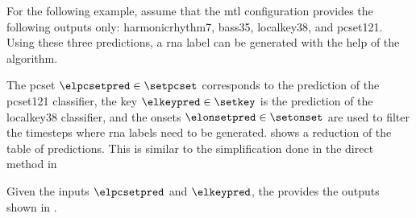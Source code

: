
For the following example, assume that the \gls{mtl}
configuration provides the following outputs only:
\gls{harmonicrhythm7}, \gls{bass35},  \gls{localkey38}, and
\gls{pcset121}. Using these three predictions, a \gls{rna}
label can be generated with the help of the \algorithmrn{}
algorithm.

The \gls{pcset} $\elpcsetpred \in \setpcset$ corresponds to
the prediction of the \gls{pcset121} classifier, the key
$\elkeypred \in \setkey$ is the prediction of the
\gls{localkey38} classifier, and the onsets $\elonsetpred
\in \setonset$ are used to filter the timesteps where
\gls{rna} labels need to be generated.
 shows a reduction of the
table of predictions. This is similar to the simplification
done in the direct method in



Given the inputs $\elpcsetpred$ and $\elkeypred$, the
\algorithmrn{} provides the outputs shown in
.


